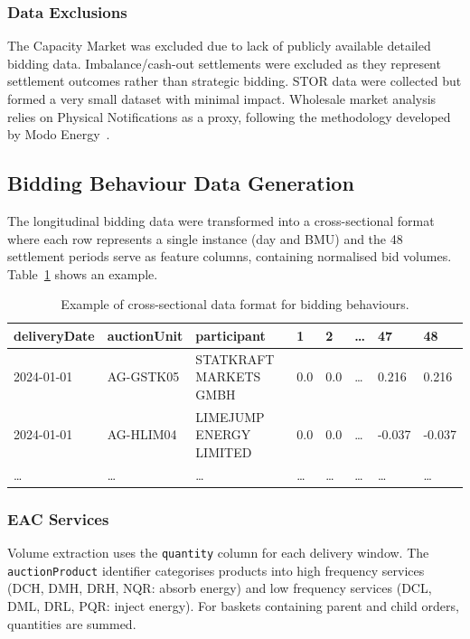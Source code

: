 \documentclass[12pt,a4paper]{article}
\begin{document}
\subsubsection{Data Exclusions}
The Capacity Market was excluded due to lack of publicly available detailed bidding data. Imbalance/cash-out settlements were excluded as they represent settlement outcomes rather than strategic bidding. STOR data were collected but formed a very small dataset with minimal impact. Wholesale market analysis relies on Physical Notifications as a proxy, following the methodology developed by Modo Energy~\cite{modo2024}.

\subsection{Bidding Behaviour Data Generation}
The longitudinal bidding data were transformed into a cross-sectional format where each row represents a single instance (day and BMU) and the 48 settlement periods serve as feature columns, containing normalised bid volumes. Table~\ref{tab:cross_sec} shows an example.

\begin{table}[H]
\centering
\small
\caption{Example of cross-sectional data format for bidding behaviours.}
\label{tab:cross_sec}
\begin{tabular}{@{}llllllll@{}}
\toprule
deliveryDate & auctionUnit & participant & 1 & 2 & \dots & 47 & 48 \\
\midrule
2024-01-01 & AG-GSTK05 & STATKRAFT MARKETS GMBH & 0.0 & 0.0 & \dots & 0.216 & 0.216 \\
2024-01-01 & AG-HLIM04 & LIMEJUMP ENERGY LIMITED & 0.0 & 0.0 & \dots & -0.037 & -0.037 \\
\dots & \dots & \dots & \dots & \dots & \dots & \dots & \dots \\
\bottomrule
\end{tabular}
\end{table}

\subsubsection{EAC Services}
Volume extraction uses the \texttt{quantity} column for each delivery window. The \texttt{auctionProduct} identifier categorises products into high frequency services (DCH, DMH, DRH, NQR: absorb energy) and low frequency services (DCL, DML, DRL, PQR: inject energy). For baskets containing parent and child orders, quantities are summed.
\end{document}
